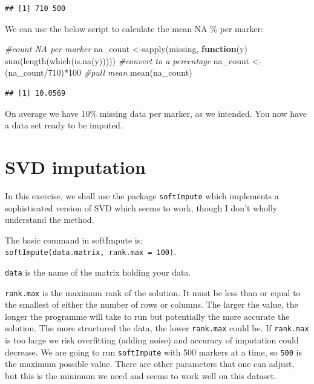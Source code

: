 \documentclass[
]{book}
\newenvironment{Shaded}{\begin{snugshade}}{\end{snugshade}}
\newcommand{\CommentTok}[1]{\textcolor[rgb]{0.56,0.35,0.01}{\textit{#1}}}
\newcommand{\ControlFlowTok}[1]{\textcolor[rgb]{0.13,0.29,0.53}{\textbf{#1}}}
\newcommand{\DecValTok}[1]{\textcolor[rgb]{0.00,0.00,0.81}{#1}}
\newcommand{\FunctionTok}[1]{\textcolor[rgb]{0.00,0.00,0.00}{#1}}
\newcommand{\NormalTok}[1]{#1}
\newcommand{\OtherTok}[1]{\textcolor[rgb]{0.56,0.35,0.01}{#1}}
\newcommand{\SpecialCharTok}[1]{\textcolor[rgb]{0.00,0.00,0.00}{#1}}
\begin{document}
\begin{verbatim}
## [1] 710 500
\end{verbatim}

We can use the below script to calculate the mean NA \% per marker:

\begin{Shaded}
\begin{Highlighting}[]
\CommentTok{\#count NA per marker}
\NormalTok{na\_count }\OtherTok{\textless{}{-}}\FunctionTok{sapply}\NormalTok{(missing, }\ControlFlowTok{function}\NormalTok{(y) }\FunctionTok{sum}\NormalTok{(}\FunctionTok{length}\NormalTok{(}\FunctionTok{which}\NormalTok{(}\FunctionTok{is.na}\NormalTok{(y)))))}
\CommentTok{\#convert to a percentage}
\NormalTok{na\_count }\OtherTok{\textless{}{-}}\NormalTok{(na\_count}\SpecialCharTok{/}\DecValTok{710}\NormalTok{)}\SpecialCharTok{*}\DecValTok{100}
\CommentTok{\#pull mean}
\FunctionTok{mean}\NormalTok{(na\_count)}
\end{Highlighting}
\end{Shaded}

\begin{verbatim}
## [1] 10.0569
\end{verbatim}

On average we have 10\% missing data per marker, as we intended. You now have a data set ready to be imputed.

\hypertarget{svd-imputation}{%
\section{SVD imputation}\label{svd-imputation}}

In this exercise, we shall use the package \texttt{softImpute} which implements a sophisticated version of SVD which seems to work, though I don't wholly understand the method.

The basic command in softImpute is: \texttt{softImpute(data.matrix,\ rank.max\ =\ 100)}.

\texttt{data} is the name of the matrix holding your data.

\texttt{rank.max} is the maximum rank of the solution. It must be less than or equal to the smallest of either the number of rows or columns. The larger the value, the longer the programme will take to run but potentially the more accurate the solution. The more structured the data, the lower \texttt{rank.max} could be. If \texttt{rank.max} is too large we risk overfitting (adding noise) and accuracy of imputation could decrease. We are going to run \texttt{softImpute} with 500 markers at a time, so \texttt{500} is the maximum possible value. There are other parameters that one can adjust, but this is the minimum we need and seems to work well on this dataset.
\end{document}
